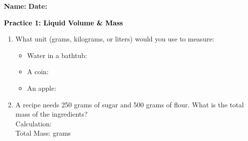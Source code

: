 \documentclass[12pt, letterpaper, fleqn]{article}
\newcommand{\blank}{\underline{\hspace{2.2cm}}}
\begin{document}
\textbf{Name:} \underline{\hspace{5cm}}
\hfill
\textbf{Date:} \underline{\hspace{3cm}}\\

\begin{tcolorbox}[colback=customteal!20]
    \large\textcolor{black}{\textbf{Practice 1: Liquid Volume & Mass}}
\end{tcolorbox}

\vspace{5mm}
\begin{enumerate}[itemsep=2.5cm, leftmargin=0.6cm]
\item What unit (grams, kilograms, or liters) would you use to measure:
  \begin{itemize}[itemsep=0.8cm]
    \item Water in a bathtub: \blank
    \item A coin: \blank
    \item An apple: \blank
  \end{itemize}

\item A recipe needs 250 grams of sugar and 500 grams of flour. What is the total mass of the ingredients?
\\
Calculation: \vspace{2cm}
\\
Total Mass: \blank grams
\end{enumerate}
\end{document}
